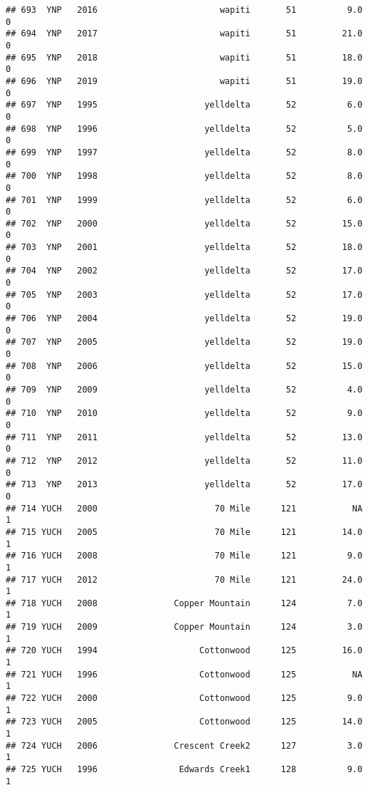 \documentclass[
]{article}
\begin{document}
\begin{verbatim}
## 693  YNP   2016                        wapiti       51          9.0       0
## 694  YNP   2017                        wapiti       51         21.0       0
## 695  YNP   2018                        wapiti       51         18.0       0
## 696  YNP   2019                        wapiti       51         19.0       0
## 697  YNP   1995                     yelldelta       52          6.0       0
## 698  YNP   1996                     yelldelta       52          5.0       0
## 699  YNP   1997                     yelldelta       52          8.0       0
## 700  YNP   1998                     yelldelta       52          8.0       0
## 701  YNP   1999                     yelldelta       52          6.0       0
## 702  YNP   2000                     yelldelta       52         15.0       0
## 703  YNP   2001                     yelldelta       52         18.0       0
## 704  YNP   2002                     yelldelta       52         17.0       0
## 705  YNP   2003                     yelldelta       52         17.0       0
## 706  YNP   2004                     yelldelta       52         19.0       0
## 707  YNP   2005                     yelldelta       52         19.0       0
## 708  YNP   2006                     yelldelta       52         15.0       0
## 709  YNP   2009                     yelldelta       52          4.0       0
## 710  YNP   2010                     yelldelta       52          9.0       0
## 711  YNP   2011                     yelldelta       52         13.0       0
## 712  YNP   2012                     yelldelta       52         11.0       0
## 713  YNP   2013                     yelldelta       52         17.0       0
## 714 YUCH   2000                       70 Mile      121           NA       1
## 715 YUCH   2005                       70 Mile      121         14.0       1
## 716 YUCH   2008                       70 Mile      121          9.0       1
## 717 YUCH   2012                       70 Mile      121         24.0       1
## 718 YUCH   2008               Copper Mountain      124          7.0       1
## 719 YUCH   2009               Copper Mountain      124          3.0       1
## 720 YUCH   1994                    Cottonwood      125         16.0       1
## 721 YUCH   1996                    Cottonwood      125           NA       1
## 722 YUCH   2000                    Cottonwood      125          9.0       1
## 723 YUCH   2005                    Cottonwood      125         14.0       1
## 724 YUCH   2006               Crescent Creek2      127          3.0       1
## 725 YUCH   1996                Edwards Creek1      128          9.0       1

\end{verbatim}
\end{document}
